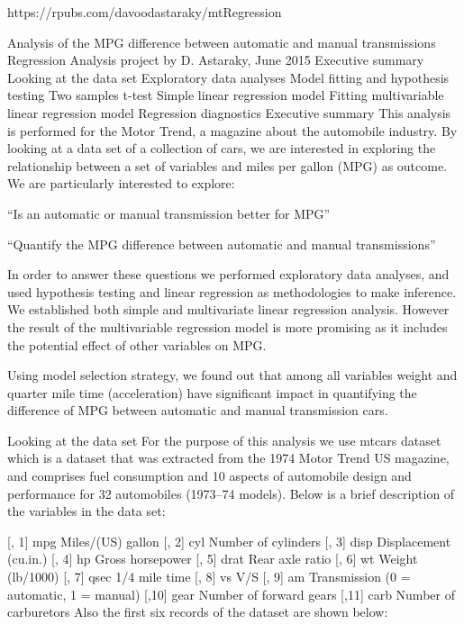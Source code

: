 https://rpubs.com/davoodastaraky/mtRegression

Analysis of the MPG difference between automatic and manual transmissions
Regression Analysis project by D. Astaraky, June 2015
Executive summary
Looking at the data set
Exploratory data analyses
Model fitting and hypothesis testing
Two samples t-test
Simple linear regression model
Fitting multivariable linear regression model
Regression diagnostics
Executive summary
This analysis is performed for the Motor Trend, a magazine about the automobile industry. By looking at a data set of a collection of cars, we are interested in exploring the relationship between a set of variables and miles per gallon (MPG) as outcome. We are particularly interested to explore:

“Is an automatic or manual transmission better for MPG”

“Quantify the MPG difference between automatic and manual transmissions”

In order to answer these questions we performed exploratory data analyses, and used hypothesis testing and linear regression as methodologies to make inference. We established both simple and multivariate linear regression analysis. However the result of the multivariable regression model is more promising as it includes the potential effect of other variables on MPG.

Using model selection strategy, we found out that among all variables weight and quarter mile time (acceleration) have significant impact in quantifying the difference of MPG between automatic and manual transmission cars.

Looking at the data set
For the purpose of this analysis we use mtcars dataset which is a dataset that was extracted from the 1974 Motor Trend US magazine, and comprises fuel consumption and 10 aspects of automobile design and performance for 32 automobiles (1973–74 models). Below is a brief description of the variables in the data set:

[, 1]   mpg     Miles/(US) gallon
[, 2]   cyl     Number of cylinders
[, 3]   disp    Displacement (cu.in.)
[, 4]   hp      Gross horsepower
[, 5]   drat    Rear axle ratio
[, 6]   wt      Weight (lb/1000)
[, 7]   qsec    1/4 mile time
[, 8]   vs      V/S
[, 9]   am      Transmission (0 = automatic, 1 = manual)
[,10]   gear    Number of forward gears
[,11]   carb    Number of carburetors
Also the first six records of the dataset are shown below:


